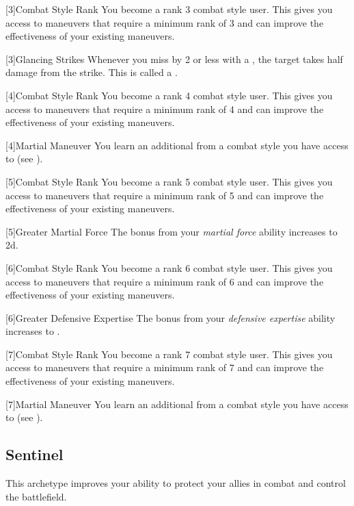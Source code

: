         {
            [3]{Combat Style Rank} You become a rank 3 combat style user.
            This gives you access to maneuvers that require a minimum rank of 3 and can improve the effectiveness of your existing maneuvers.

            [3]{Glancing Strikes} Whenever you miss by 2 or less with a , the target takes half damage from the strike.
            This is called a .
        }

        {
            [4]{Combat Style Rank} You become a rank 4 combat style user.
            This gives you access to maneuvers that require a minimum rank of 4 and can improve the effectiveness of your existing maneuvers.

            [4]{Martial Maneuver}
            You learn an additional  from a combat style you have access to (see ).
        }

        {
            [5]{Combat Style Rank} You become a rank 5 combat style user.
            This gives you access to maneuvers that require a minimum rank of 5 and can improve the effectiveness of your existing maneuvers.

            [5]{Greater Martial Force} The bonus from your \textit{martial force} ability increases to \plus2d.
        }

        {
            [6]{Combat Style Rank} You become a rank 6 combat style user.
            This gives you access to maneuvers that require a minimum rank of 6 and can improve the effectiveness of your existing maneuvers.

            [6]{Greater Defensive Expertise} The bonus from your \textit{defensive expertise} ability increases to .
        }

        {
            [7]{Combat Style Rank} You become a rank 7 combat style user.
            This gives you access to maneuvers that require a minimum rank of 7 and can improve the effectiveness of your existing maneuvers.

            [7]{Martial Maneuver}
            You learn an additional  from a combat style you have access to (see ).
        }

    \newpage
    \subsection{Sentinel}
        This archetype improves your ability to protect your allies in combat and control the battlefield.

